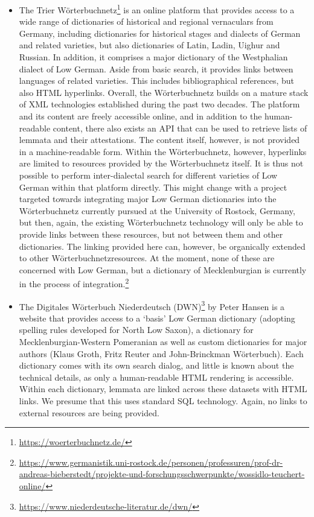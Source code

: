 \begin{itemize}
\item The Trier Wörterbuchnetz\footnote{\url{https://woerterbuchnetz.de/}} is an online platform that provides access to a wide range of dictionaries of historical and regional vernaculars from Germany, including dictionaries for historical stages and dialects of German and related varieties, but also dictionaries of Latin, Ladin, Uighur and Russian. In addition, it comprises a major dictionary of the Westphalian dialect of Low German. Aside from basic search, it provides links between languages of related varieties. This includes bibliographical references, but also HTML hyperlinks. Overall, the Wörterbuchnetz builds on a mature stack of XML technologies established during the past two decades. The platform and its content are freely accessible online, and in addition to the human-readable content, there also exists an API that can be used to retrieve lists of lemmata and their attestations. The content itself, however, is not provided in a machine-readable form. Within the Wörterbuchnetz, however, hyperlinks are limited to resources provided by the Wörterbuchnetz itself. It is thus not possible to perform inter-dialectal search for different varieties of Low German within that platform directly. This might change with a project targeted towards integrating major Low German dictionaries into the Wörterbuchnetz currently pursued at the University of Rostock, Germany, but then, again, the existing Wörterbuchnetz technology will only be able to provide links between these resources, but not between them and other dictionaries. 
The linking provided here can, however, be organically extended to other Wörterbuchnetzresources. At the moment, none of these are concerned with Low German, but a dictionary of Mecklenburgian is currently in the process of integration.\footnote{\url{https://www.germanistik.uni-rostock.de/personen/professuren/prof-dr-andreas-bieberstedt/projekte-und-forschungsschwerpunkte/wossidlo-teuchert-online/}} 
\item The Digitales Wörterbuch Niederdeutsch (DWN)\footnote{\url{https://www.niederdeutsche-literatur.de/dwn/}} by Peter Hansen is a website that provides access to a `basis' Low German dictionary (adopting spelling rules developed for North Low Saxon), a dictionary for Mecklenburgian-Western Pomeranian as well as custom dictionaries for major authors (Klaus Groth, Fritz Reuter and John-Brinckman Wörterbuch). Each dictionary comes with its own search dialog, and little is known about the technical details, as only a human-readable HTML rendering is accessible. Within each dictionary, lemmata are linked across these datasets with HTML links. We presume that this uses standard SQL technology. Again, no links to external resources are being provided.

\end{itemize}

